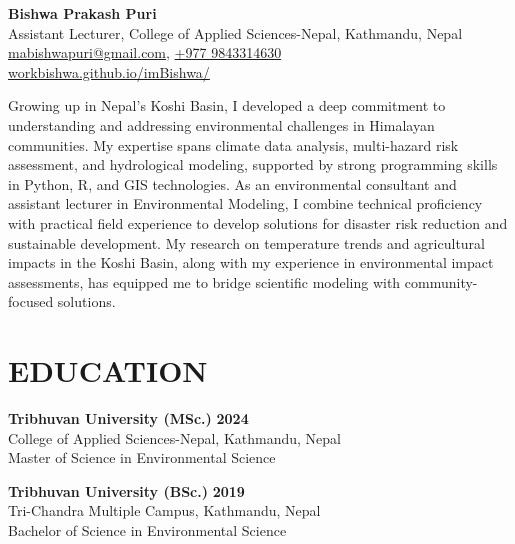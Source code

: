 \documentclass[a4paper, 09pt]{extarticle}
\begin{document}
\begin{center}
\textbf{\huge Bishwa Prakash Puri}\\[4pt] 
Assistant Lecturer, College of Applied Sciences-Nepal, Kathmandu, Nepal\\
\href{mailto:mabishwapuri@gmail.com}{mabishwapuri@gmail.com}, 
\href{tel:+9779843314630}{+977 9843314630} \\
\href{https://workbishwa.github.io/imBishwa/}{workbishwa.github.io/imBishwa/}

\end{center}

Growing up in Nepal's Koshi Basin, I developed a deep commitment to understanding and addressing environmental challenges in Himalayan communities. My expertise spans climate data analysis, multi-hazard risk assessment, and hydrological modeling, supported by strong programming skills in Python, R, and GIS technologies. As an environmental consultant and assistant lecturer in Environmental Modeling, I combine technical proficiency with practical field experience to develop solutions for disaster risk reduction and sustainable development. My research on temperature trends and agricultural impacts in the Koshi Basin, along with my experience in environmental impact assessments, has equipped me to bridge scientific modeling with community-focused solutions.

\section*{EDUCATION}

\textbf{Tribhuvan University (MSc.)} \hfill \textbf{2024}\\[2pt] 
College of Applied Sciences-Nepal, Kathmandu, Nepal\\
Master of Science in Environmental Science

\vspace{5pt}

\noindent
\textbf{Tribhuvan University (BSc.)} \hfill \textbf{2019}\\[2pt] 
Tri-Chandra Multiple Campus, Kathmandu, Nepal\\
Bachelor of Science in Environmental Science

\vspace{5pt}
\end{document}
